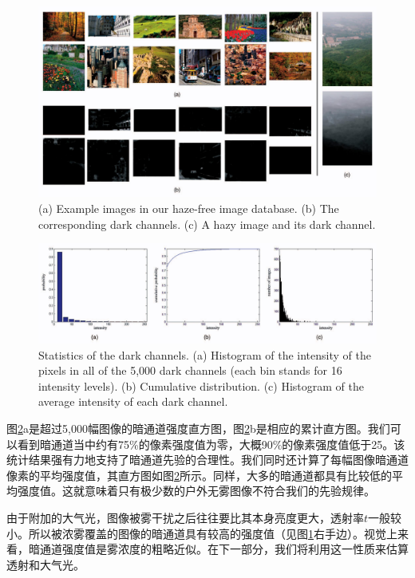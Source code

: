 \documentclass{ctexart}
\begin{document}
\begin{figure}[tbp]
	\centering
	\includegraphics[width=\textwidth]{img/04.jpg}
	\caption{(a) Example images in our haze-free image database. (b) The corresponding dark channels. (c) A hazy image and its dark channel.}\label{fig:04}
\end{figure}

\begin{figure}[tbp]
	\centering
	\includegraphics[width=\textwidth]{img/05.jpg}
	\caption{Statistics of the dark channels. (a) Histogram of the intensity of the pixels in all of the 5,000 dark channels (each bin stands for 16 intensity levels). (b) Cumulative distribution. (c) Histogram of the average intensity of each dark channel.}\label{fig:05}
\end{figure}

图\ref{fig:05}a是超过5,000幅图像的暗通道强度直方图，图\ref{fig:05}b是相应的累计直方图。我们可以看到暗通道当中约有75\%的像素强度值为零，大概90\%的像素强度值低于25。该统计结果强有力地支持了暗通道先验的合理性。我们同时还计算了每幅图像暗通道像素的平均强度值，其直方图如图\ref{fig:05}所示。同样，大多的暗通道都具有比较低的平均强度值。这就意味着只有极少数的户外无雾图像不符合我们的先验规律。\par

由于附加的大气光，图像被雾干扰之后往往要比其本身亮度更大，透射率$t$一般较小。所以被浓雾覆盖的图像的暗通道具有较高的强度值（见图\ref{fig:04}右手边）。视觉上来看，暗通道强度值是雾浓度的粗略近似。在下一部分，我们将利用这一性质来估算透射和大气光。\par
\end{document}
